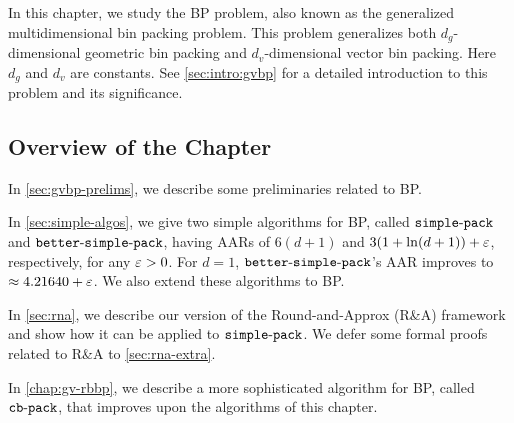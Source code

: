 In this chapter, we study the  BP problem,
also known as the generalized multidimensional bin packing problem.
This problem generalizes both $d_g$-dimensional geometric bin packing
and $d_v$-dimensional vector bin packing.
Here $d_g$ and $d_v$ are constants.
See \cref{sec:intro:gvbp} for a detailed introduction to this problem and its significance.

\subsection*{Overview of the Chapter}

In \cref{sec:gvbp-prelims}, we describe some preliminaries related
to  BP.

In \cref{sec:simple-algos}, we give two simple algorithms for  BP,
called $\operatorname{\mathtt{simple-pack}}$ and $\operatorname{\mathtt{better-simple-pack}}$, having AARs of
$6(d+1)$ and $3(1+\ln(d+1))+\varepsilon$, respectively, for any $\varepsilon > 0$.
For $d = 1$, $\operatorname{\mathtt{better-simple-pack}}$'s AAR improves to $\approx 4.21640 + \varepsilon$.
We also extend these algorithms to  BP.

In \cref{sec:rna}, we describe our version of the Round-and-Approx (R\&A) framework
and show how it can be applied to $\operatorname{\mathtt{simple-pack}}$.
We defer some formal proofs related to R\&A to \cref{sec:rna-extra}.

In \cref{chap:gv-rbbp}, we describe a more sophisticated algorithm for  BP,
called $\operatorname{\mathtt{cb-pack}}$, that improves upon the algorithms of this chapter.
